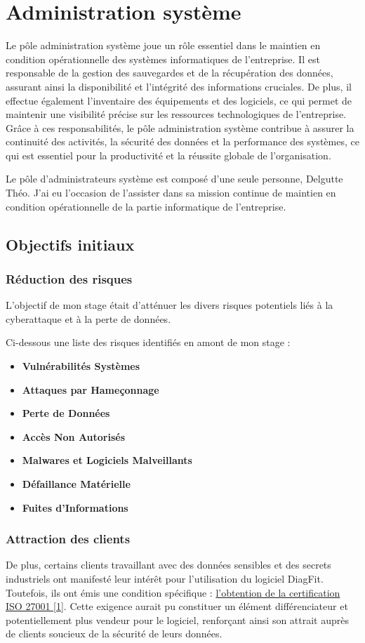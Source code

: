 \section{Administration système}
Le pôle administration système joue un rôle essentiel dans le maintien en condition opérationnelle des systèmes informatiques de l'entreprise.
Il est responsable de la gestion des sauvegardes et de la récupération des données, assurant ainsi la disponibilité et l'intégrité des informations cruciales.
De plus, il effectue également l'inventaire des équipements et des logiciels, ce qui permet de maintenir une visibilité précise sur les ressources technologiques de l'entreprise.
Grâce à ces responsabilités, le pôle administration système contribue à assurer la continuité des activités, la sécurité des données et la performance des systèmes, ce qui est essentiel pour la productivité et la réussite globale de l'organisation.

Le pôle d'administrateurs système est composé d'une seule personne, Delgutte Théo.
J'ai eu l'occasion de l'assister dans sa mission continue de maintien en condition opérationnelle de la partie informatique de l'entreprise.

\subsection{Objectifs initiaux}
\subsubsection{Réduction des risques}
L'objectif de mon stage était d'atténuer les divers risques potentiels liés à la cyberattaque et à la perte de données.

Ci-dessous une liste des risques identifiés en amont de mon stage :
\begin{itemize}
    \item \textbf{Vulnérabilités Systèmes}
    \item \textbf{Attaques par Hameçonnage}
    \item \textbf{Perte de Données}
    \item \textbf{Accès Non Autorisés}
    \item \textbf{Malwares et Logiciels Malveillants}
    \item \textbf{Défaillance Matérielle}
    \item \textbf{Fuites d'Informations}
\end{itemize}

\subsubsection{Attraction des clients}
De plus, certains clients travaillant avec des données sensibles et des secrets industriels ont manifesté leur intérêt pour l'utilisation du logiciel DiagFit.
Toutefois, ils ont émis une condition spécifique : \hyperref[iso]{l'obtention de la certification ISO 27001 [1]}.
Cette exigence aurait pu constituer un élément différenciateur et potentiellement plus vendeur pour le logiciel, renforçant ainsi son attrait auprès de clients soucieux de la sécurité de leurs données.


